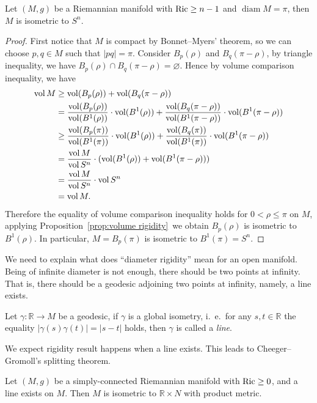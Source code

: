 \begin{thm}
    Let $(M,g)$ be a Riemannian manifold with $\operatorname{Ric}\geq n-1$ and $\operatorname{diam}{M}=\pi$, then $M$ is isometric to $S^n$.
\end{thm}
\begin{proof}
    First notice that $M$ is compact by Bonnet--Myers' theorem, so we can choose $p,q\in M$ such that $|pq|=\pi$.
    Consider $B_p(\rho)$ and $B_q(\pi-\rho)$, by triangle inequality, we have $B_p(\rho)\cap B_q(\pi-\rho)=\varnothing$.
    Hence by volume comparison inequality, we have
    \begin{align*}
        \operatorname{vol}{M}&\geq\operatorname{vol}(B_p(\rho))+\operatorname{vol}(B_q(\pi-\rho))\\
        &=\frac{\operatorname{vol}(B_p(\rho))}{\operatorname{vol}(B^1(\rho))}\cdot\operatorname{vol}(B^1(\rho))+\frac{\operatorname{vol}(B_q(\pi-\rho))}{\operatorname{vol}(B^1(\pi-\rho))}\cdot\operatorname{vol}(B^1(\pi-\rho))\\
        &\geq\frac{\operatorname{vol}(B_p(\pi))}{\operatorname{vol}(B^1(\pi))}\cdot\operatorname{vol}(B^1(\rho))+\frac{\operatorname{vol}(B_q(\pi))}{\operatorname{vol}(B^1(\pi))}\cdot\operatorname{vol}(B^1(\pi-\rho))\\
        &=\frac{\operatorname{vol}{M}}{\operatorname{vol}{S^n}}\cdot(\operatorname{vol}(B^1(\rho))+\operatorname{vol}(B^1(\pi-\rho)))\\
        &=\frac{\operatorname{vol}{M}}{\operatorname{vol}{S^n}}\cdot\operatorname{vol}{S^n}\\
        &=\operatorname{vol}{M}.
    \end{align*}
    Therefore the equality of volume comparison inequality holds for $0<\rho\leq\pi$ on $M$, applying Proposition~\ref{prop:volume rigidity}~we obtain $B_p(\rho)$ is isometric to $B^1(\rho)$.
    In particular, $M=B_p(\pi)$ is isometric to $B^1(\pi)=S^n$.
\end{proof}

We need to explain what does ``diameter rigidity'' mean for an open manifold.
Being of infinite diameter is not enough, there should be two points at infinity.
That is, there should be a geodesic adjoining two points at infinity, namely, a line exists.

\begin{defn}
    Let $\gamma:\mathbb{R}\to M$ be a geodesic, if $\gamma$ is a global isometry, i.\ e.\ for any $s,t\in\mathbb{R}$ the equality $|\gamma(s)\gamma(t)|=|s-t|$ holds, then $\gamma$ is called a \emph{line}.
\end{defn}

We expect rigidity result happens when a line exists.
This leads to Cheeger--Gromoll's splitting theorem.

\begin{thm}[Splitting]
    Let $(M,g)$ be a simply-connected Riemannian manifold with $\operatorname{Ric}\geq 0$, and a line exists on $M$.
    Then $M$ is isometric to $\mathbb{R}\times N$ with product metric.
\end{thm}

